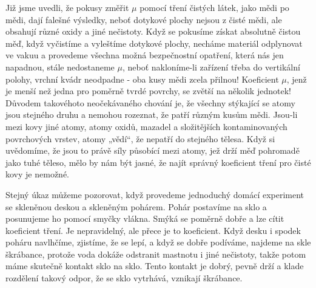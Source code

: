 {    Již jsme uvedli, že pokusy změřit \(\mu\) pomocí tření čistých látek, jako mědi po mědi, dají 
    falešné výsledky, neboť dotykové plochy nejsou z čisté mědi, ale obsahují různé oxidy a jiné 
    nečistoty. Když se pokusíme získat absolutně čistou měď, když vyčistíme a vyleštíme dotykové 
    plochy, necháme materiál odplynovat ve vakuu a provedeme všechna možná bezpečnostní opatření, 
    která nás jen napadnou, stále nedostaneme \(\mu\), neboť nakloníme-li zařízení třeba do 
    vertikální polohy, vrchní kvádr neodpadne - oba kusy mědi zcela přilnou! Koeficient \(\mu\), 
    jenž je menší než jedna pro poměrně tvrdé povrchy, se zvětší na několik jednotek! Důvodem 
    takovéhoto neočekávaného chování je, že všechny stýkající se atomy jsou stejného druhu a 
    nemohou rozeznat, že patří různým kusům mědi. Jsou-li mezi kovy jiné atomy, atomy oxidů, 
    mazadel a složitějších kontaminovaných povrchových vrstev, atomy „vědí“, že nepatří do stejného 
    tělesa. Když si uvědomíme, že jsou to právě síly působící mezi atomy, jež drží měď pohromadě 
    jako tuhé těleso, mělo by nám být jasné, že najít správný koeficient tření pro čisté kovy je 
    nemožné.
    
    Stejný úkaz můžeme pozorovat, když provedeme jednoduchý domácí experiment se skleněnou deskou a 
    skleněným pohárem. Pohár postavíme na sklo a posunujeme ho pomocí smyčky vlákna. Smýká se 
    poměrně dobře a lze cítit koeficient tření. Je nepravidelný, ale přece je to koeficient. Když 
    desku i spodek poháru navlhčíme, zjistíme, že se lepí, a když se dobře podíváme, najdeme na 
    skle škrábance, protože voda dokáže odstranit mastnotu i jiné nečistoty, takže potom máme 
    skutečně kontakt sklo na sklo. Tento kontakt je dobrý, pevně drží a klade rozdělení takový 
    odpor, že se sklo vytrhává, vznikají škrábance.
    
    
}
